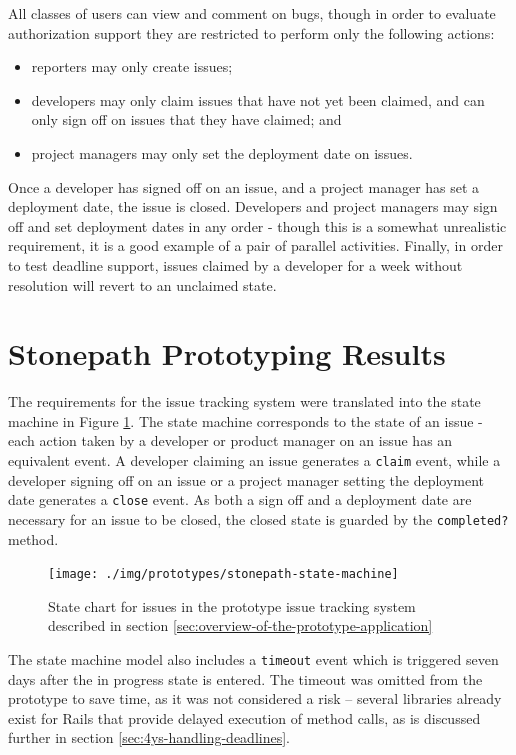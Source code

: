 \documentclass[document.tex]{subfiles}
\begin{document}
All classes of users can view and comment on bugs, though in order to evaluate authorization support they are restricted to perform only the following actions:
\begin{itemize}
\item reporters may only create issues;
\item developers may only claim issues that have not yet been claimed, and can only sign off on issues that they have claimed; and
\item project managers may only set the deployment date on issues.
\end{itemize}

Once a developer has signed off on an issue, and a project manager has set a deployment date, the issue is closed. Developers and project managers may sign off and set deployment dates in any order - though this is a somewhat unrealistic requirement, it is a good example of a pair of parallel activities. Finally, in order to test deadline support, issues claimed by a developer for a week without resolution will revert to an unclaimed state.


\section {Stonepath Prototyping Results}
\label {sec:stonepath-prototyping-results}

The requirements for the issue tracking system were translated into the state machine in Figure \ref{fig:stonepath-prototype-state-machine}. The state machine corresponds to the state of an issue - each action taken by a developer or product manager on an issue has an equivalent event. A developer claiming an issue generates a \verb!claim! event, while a developer signing off on an issue or a project manager setting the deployment date generates a \verb!close! event. As both a sign off and a deployment date are necessary for an issue to be closed, the closed state is guarded by the \verb!completed?! method.

\begin{figure}[!ht]
\centering \texttt{[image: ./img/prototypes/stonepath-state-machine]}
\caption{State chart for issues in the prototype issue tracking system described in section \ref{sec:overview-of-the-prototype-application}}
\label{fig:stonepath-prototype-state-machine}
\end{figure}

The state machine model also includes a \verb!timeout! event which is triggered seven days after the in progress state is entered. The timeout was omitted from the prototype to save time, as it was not considered a risk -- several libraries already exist for Rails that provide delayed execution of method calls, as is discussed further in section \ref{sec:4ys-handling-deadlines}.
\end{document}
